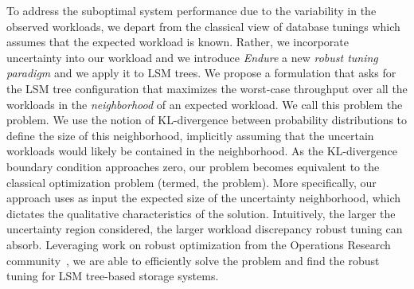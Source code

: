     
To address the suboptimal system performance due to the variability in the observed workloads, we depart
from the classical view of database tunings which assumes that the expected workload is known. Rather, 
we incorporate uncertainty into our workload and we introduce {\it Endure} a new \emph{robust tuning paradigm} and we 
apply it to LSM trees.
We propose a formulation that asks for the LSM tree configuration that maximizes the worst-case throughput over all the 
workloads in the \emph{neighborhood} of an expected workload. We call this problem 
the {\robustw} problem. We use the notion of KL-divergence between probability 
distributions to define the size of this neighborhood, implicitly 
assuming that the uncertain workloads would likely be contained in the 
neighborhood. As the KL-divergence boundary condition approaches zero, 
our problem becomes equivalent to the classical optimization problem (termed, 
the {\nominal} problem). More specifically, our approach uses as input the expected 
size of the uncertainty neighborhood, which dictates the qualitative 
characteristics of the solution. Intuitively, the larger the uncertainty
region considered, the larger workload discrepancy robust tuning can absorb.
Leveraging  work on robust optimization from the Operations Research 
community~\cite{Bertsimas2010, Ben-Tal1998, Ben-Tal2013}, we are able to efficiently solve the 
{\robustw} problem and find the robust tuning for LSM tree-based storage systems.
    

